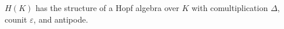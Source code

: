 $H(K)$ has the structure of a Hopf algebra over $K$ with comultiplication $\Delta$, counit $\varepsilon$, and antipode.
